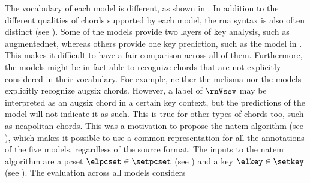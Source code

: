 
The vocabulary of each model is different, as shown in
. In addition to the different
qualities of chords supported by each model, the \gls{rna}
syntax is also often distinct (see
). Some of
the models provide two layers of key analysis, such as
\gls{augmentednet}, whereas others provide one key
prediction, such as the model in
\textcite{mcleod2021modular}. This makes it difficult to
have a fair comparison across all of them. Furthermore, the
models might be in fact able to recognize chords that are
not explicitly considered in their vocabulary. For example,
neither the \gls{melisma} nor the
\textcite{mcleod2021modular} models explicitly recognize
\gls{augsix} chords. However, a label of $\rnVsev$ may be
interpreted as an \gls{augsix} chord in a certain key
context, but the predictions of the model will not indicate
it as such. This is true for other types of chords too, such
as \gls{neapolitan} chords. This was a motivation to propose
the \gls{natem} algorithm (see
), which
makes it possible to use a common representation for all the
annotations of the five models, regardless of the source
format. The inputs to the \gls{natem} algorithm are a
\gls{pcset} $\elpcset \in \setpcset$ (see
) and a key $\elkey
\in \setkey$ (see ). The
evaluation across all models considers 

